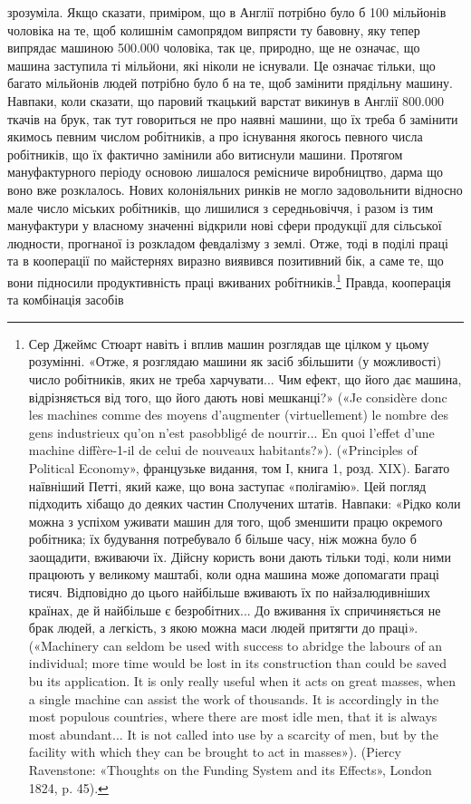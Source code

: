 \parcont{}  %
зрозуміла. Якщо сказати, приміром, що в Англії потрібно було б
100 мільйонів чоловіка на те, щоб колишнім самопрядом випрясти
ту бавовну, яку тепер випрядає машиною 500.000 чоловіка, так це,
природно, ще не означає, що машина заступила ті мільйони, які
ніколи не існували. Це означає тільки, що багато мільйонів
людей потрібно було б на те, щоб замінити прядільну машину.
Навпаки, коли сказати, що паровий ткацький варстат викинув
в Англії 800.000 ткачів на брук, так тут говориться не про наявні
машини, що їх треба б замінити якимось певним числом робітників,
а про існування якогось певного числа робітників, що їх
фактично замінили або витиснули машини. Протягом мануфактурного
періоду основою лишалося ремісниче виробництво, дарма
що воно вже розклалось. Нових колоніяльних ринків не могло
задовольнити відносно мале число міських робітників, що лишилися
з середньовіччя, і разом із тим мануфактури у власному
значенні відкрили нові сфери продукції для сільської людности,
прогнаної із розкладом февдалізму з землі. Отже, тоді в поділі
праці та в кооперації по майстернях виразно виявився позитивний
бік, а саме те, що вони підносили продуктивність праці вживаних
робітників.\footnote{
Сер Джеймс Стюарт навіть і вплив машин розглядав ще цілком у
цьому розумінні. «Отже, я розглядаю машини як засіб збільшити (у можливості)
число робітників, яких не треба харчувати... Чим ефект, що його
дає машина, відрізняється від того, що його дають нові мешканці?»
(«Je considère donc les machines comme des moyens d’augmenter (virtuellement)
le nombre des gens industrieux qu’on n’est pasobbligé de nourrir...
En quoi l’effet d’une machine diffère-1-il de celui de nouveaux habitants?»).
(«Principles of Political Economy», французьке видання, том І, книга 1,
розд. XIX). Багато наївніший Петті, який каже, що вона заступає «полігамію».
Цей погляд підходить хібащо до деяких частин Сполучених штатів.
Навпаки: «Рідко коли можна з успіхом уживати машин для того, щоб
зменшити працю окремого робітника; їх будування потребувало б більше
часу, ніж можна було б заощадити, вживаючи їх. Дійсну користь вони
дають тільки тоді, коли ними працюють у великому маштабі, коли одна
машина може допомагати праці тисяч. Відповідно до цього найбільше
вживають їх по найзалюдивніших країнах, де й найбільше є безробітних...
До вживання їх спричиняється не брак людей, а легкість, з якою можна
маси людей притягти до праці». («Machinery can seldom be used with success
to abridge the labours of an individual; more time would be lost in its
construction than could be saved bu its application. It is only really useful
when it acts on great masses, when a single machine can assist the work
of thousands. It is accordingly in the most populous countries, where there
are most idle men, that it is always most abundant... It is not called into
use by a scarcity of men, but by the facility with which they can be
brought to act in masses»). (Piercy Ravenstone: «Thoughts on the Funding
System and its Effects», London 1824, p. 45).
} Правда, кооперація та комбінація засобів
